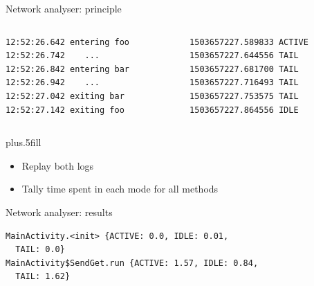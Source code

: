 \begin{frame}[fragile]{Network analyser: principle}
\begin{columns}
\begin{column}{0.5\textwidth}
\begin{lstlisting}
12:52:26.642 entering foo
12:52:26.742 	...
12:52:26.842 entering bar
12:52:26.942 	...
12:52:27.042 exiting bar
12:52:27.142 exiting foo
\end{lstlisting}
\end{column}
\begin{column}{0.5\textwidth}
\begin{lstlisting}
1503657227.589833 ACTIVE
1503657227.644556 TAIL
1503657227.681700 TAIL
1503657227.716493 TAIL
1503657227.753575 TAIL
1503657227.864556 IDLE
\end{lstlisting}
\end{column}
\end{columns}
\vskip0pt plus.5fill
\begin{itemize}
\item Replay both logs
\item Tally time spent in each mode for all methods
\end{itemize}
\end{frame}
%
%
\begin{frame}[fragile]{Network analyser: results}
\begin{lstlisting}
MainActivity.<init> {ACTIVE: 0.0, IDLE: 0.01,
  TAIL: 0.0}
MainActivity$SendGet.run {ACTIVE: 1.57, IDLE: 0.84,
  TAIL: 1.62}
\end{lstlisting}
\end{frame}
%
